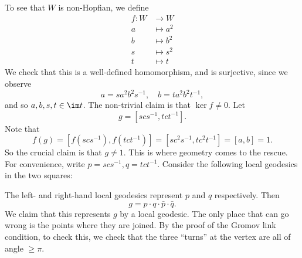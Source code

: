 \documentclass[a4paper]{article}
\begin{document}
\begin{eg}
  To see that $W$ is non-Hopfian, we define
  \begin{align*}
    f: W &\to W\\
    a &\mapsto a^2\\
    b &\mapsto b^2\\
    s &\mapsto s^2\\
    t &\mapsto t
  \end{align*}
  We check that this is a well-defined homomorphism, and is surjective, since we observe
  \[
    a = s a^2 b^2 s^{-1},\quad b = ta^2 b^2 t^{-1},
  \]
  and so $a, b, s, t \in \im t$. The non-trivial claim is that $\ker f \not= 0$. Let
  \[
    g = [scs^{-1}, tct^{-1}].
  \]
  Note that
  \[
    f(g) = [f(scs^{-1}), f(tct^{-1})] = [sc^2 s^{-1}, tc^2 t^{-1}] = [a, b] = 1.
  \]
  So the crucial claim is that $g \not= 1$. This is where geometry comes to the rescue. For convenience, write $p = scs^{-1}, q = tct^{-1}$. Consider the following local geodesics in the two squares:
  \begin{center}
  \end{center}
  The left- and right-hand local geodesics represent $p$ and $q$ respectively. Then
  \[
    g = p \cdot q \cdot \bar{p} \cdot \bar{q}.
  \]
  We claim that this represents $g$ by a local geodesic. The only place that can go wrong is the points where they are joined. By the proof of the Gromov link condition, to check this, we check that the three ``turns'' at the vertex are all of angle $\geq \pi$.
  \begin{center}
\end{center}
\end{eg}
\end{document}
